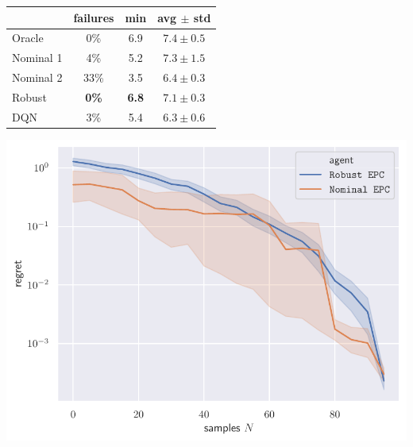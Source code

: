 \documentclass[paperwidth=36in,paperheight=48in,portrait,fontscale=0.355, margin=2cm]{baposter}
\begin{document}
\begin{poster}
{\begin{minipage}[t]{0.33\textwidth}
	\begin{tabular}{lccc}
		\toprule
		 &
		failures &
		min &
		avg $\pm$ std  \\
		\midrule
		Oracle & 0\% & {6.9} & $7.4 \pm 0.5$ \\
		\midrule
		{Nominal 1} & 4\% & {5.2} & $\mathbf{7.3} \pm 1.5$ \\
		{Nominal 2} & 33\% & {3.5} & $6.4 \pm 0.3$ \\
		Robust & \textbf{0\%} & \textbf{6.8} & $7.1 \pm 0.3$ \\
		\midrule
		DQN\footnotemark[\value{footnote}] & 3\% & 5.4 & $6.3\pm0.6$ \\
		\bottomrule
	\end{tabular}
\end{minipage}
	\begin{minipage}[t]{0.31\textwidth}
	\centering
	\includegraphics[trim={0 0.2cm 0 0.2cm}, clip, width=\linewidth]{../img/regret.pdf}
	\end{minipage}%
	
}







\end{poster}
\end{document}

